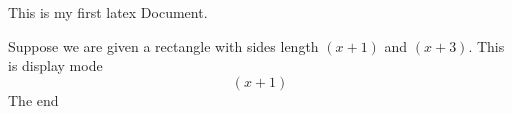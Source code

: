 \documentclass[11pt]{article}
\begin{document}
This is my first latex Document.

Suppose we are given a rectangle with sides length $(x+1)$ and $(x+3)$. This is display mode $$(x+1)$$ The end
\end{document}
